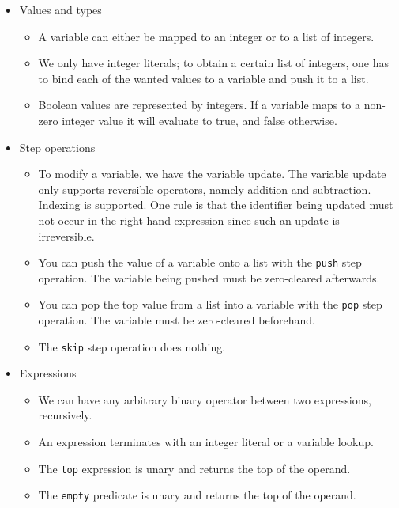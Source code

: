 \begin{itemize}
  \item Values and types
  \begin{itemize}
    \item A variable can either be mapped to an integer or to a list of integers.
    \item We only have integer literals; to obtain a certain list of integers, one has to bind each of the wanted values to a variable and push it to a list.
    \item Boolean values are represented by integers. If a variable maps to a non-zero integer value it will evaluate to true, and false otherwise.
  \end{itemize}
  \item Step operations
  \begin{itemize}
    \item To modify a variable, we have the variable update. The variable update only supports reversible operators, namely addition and subtraction. Indexing is supported. One rule is that the identifier being updated must not occur in the right-hand expression since such an update is irreversible.
    \item You can push the value of a variable onto a list with the \texttt{push} step operation. The variable being pushed must be zero-cleared afterwards.
    \item You can pop the top value from a list into a variable with the \texttt{pop} step operation. The variable must be zero-cleared beforehand.
    \item The \texttt{skip} step operation does nothing.
  \end{itemize}
  \item Expressions
  \begin{itemize}
    \item We can have any arbitrary binary operator between two expressions, recursively.
    \item An expression terminates with an integer literal or a variable lookup.
    \item The \texttt{top} expression is unary and returns the top of the operand.
    \item The \texttt{empty} predicate is unary and returns the top of the operand.
  \end{itemize}
\end{itemize}


